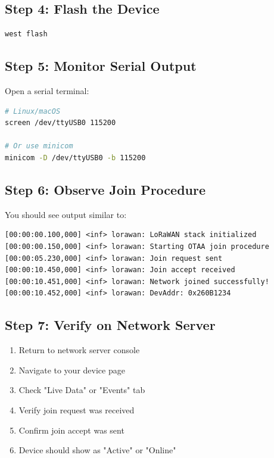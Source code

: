 \documentclass[11pt,a4paper]{article}
\begin{document}
\subsection{Step 4: Flash the Device}

\begin{lstlisting}[language=bash]
west flash
\end{lstlisting}

\subsection{Step 5: Monitor Serial Output}

Open a serial terminal:

\begin{lstlisting}[language=bash]
# Linux/macOS
screen /dev/ttyUSB0 115200

# Or use minicom
minicom -D /dev/ttyUSB0 -b 115200
\end{lstlisting}

\subsection{Step 6: Observe Join Procedure}

You should see output similar to:

\begin{lstlisting}
[00:00:00.100,000] <inf> lorawan: LoRaWAN stack initialized
[00:00:00.150,000] <inf> lorawan: Starting OTAA join procedure
[00:00:05.230,000] <inf> lorawan: Join request sent
[00:00:10.450,000] <inf> lorawan: Join accept received
[00:00:10.451,000] <inf> lorawan: Network joined successfully!
[00:00:10.452,000] <inf> lorawan: DevAddr: 0x260B1234
\end{lstlisting}

\subsection{Step 7: Verify on Network Server}

\begin{enumerate}
    \item Return to network server console
    \item Navigate to your device page
    \item Check "Live Data" or "Events" tab
    \item Verify join request was received
    \item Confirm join accept was sent
    \item Device should show as "Active" or "Online"
\end{enumerate}
\end{document}
